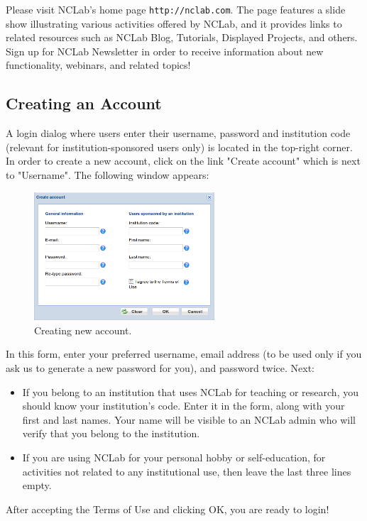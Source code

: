 \documentclass{article}
\begin{document}
\noindent
Please visit NCLab's home page {\tt http://nclab.com}. The page features a slide show 
illustrating various activities offered by NCLab, and it provides links to related resources such 
as NCLab Blog, Tutorials, Displayed Projects, and others. Sign up for NCLab Newsletter 
in order to receive information about new functionality, webinars, and related topics! 

\subsection{Creating an Account}

A login dialog where
users enter their username, password and institution code (relevant for institution-sponsored users
only) is located in the top-right corner. In order to create a new account, click on the link "Create 
account" which is next to "Username". The following window appears:\\


\begin{figure}[!ht]
\begin{center}
\includegraphics[width=0.6\textwidth]{img/create-account.png}
\end{center}
\caption{Creating new account.}
\label{fig:creacc}
\end{figure}
\newpage
\noindent
In this form, enter your preferred username, email address (to be used only if you ask
us to generate a new password for you), and password twice. Next:

\begin{itemize}
\item If you belong to an institution 
      that uses NCLab for teaching or research, you should know your institution's code. Enter it in the form, 
      along with your first and last names. Your name will be visible to an NCLab admin
      who will verify that you belong to the institution.
\item If you are using NCLab for your personal hobby or self-education, for activities not 
      related to any institutional use, then leave the last three lines empty. 
\end{itemize}
After accepting the Terms of Use and clicking OK, you are ready to login!
\end{document}
